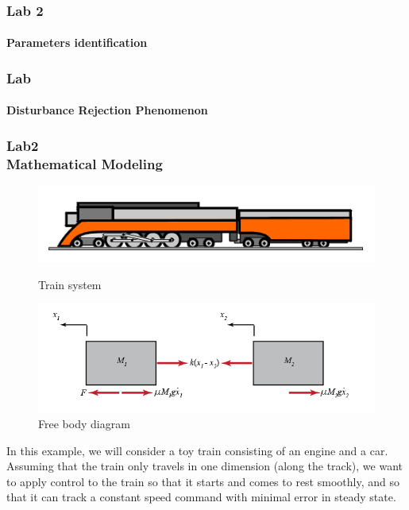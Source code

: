 \documentclass[hyperref={pdfpagelabels=true}]{beamer}
\begin{document}
\begin{frame}
\frametitle{Lab 2}
\framesubtitle{Parameters identification }
\small{
\begin{tcolorbox}[title=  ,width=9.85 cm]

\end{tcolorbox} }

\end{frame}

\begin{frame}
\frametitle{Lab}
\framesubtitle{Disturbance Rejection Phenomenon }
\tiny{
\begin{tcolorbox}[title=  ,width=9.85 cm]

\end{tcolorbox} }
\end{frame}




\begin{frame}
\frametitle{Lab2 \\{\large Mathematical Modeling}}
\begin{figure}[!tbp]
  \begin{minipage}[t]{0.2\textwidth}
\includegraphics[scale = 0.28]{figs/Selection_037.png}
    \caption{Train system}
  \end{minipage}
  \hfill
  \begin{minipage}[t]{0.52\textwidth}
\includegraphics[scale = 0.25]{figs/Selection_038.png}
    \caption{Free body diagram}
  \end{minipage}
\end{figure}
In this example, we will consider a toy train consisting of an engine and a car. Assuming that the train only travels in one dimension (along the track), we want to apply control to the train so that it starts and comes to rest smoothly, and so that it can track a constant speed command with minimal error in steady state.

\end{frame}
\end{document}

